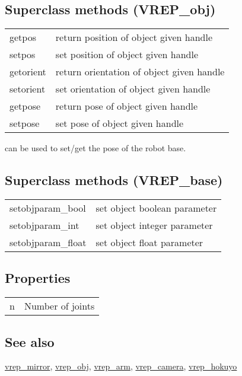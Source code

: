 \documentclass[a4paper]{article}
\begin{document}
\subsection*{Superclass methods (VREP\_obj)}
\begin{tabular}{lp{120mm}}
 getpos & return position of object given handle\\ 
 setpos & set position of object given handle\\ 
 getorient & return orientation of object given handle\\ 
 setorient & set orientation of object given handle\\ 
 getpose & return pose of object given handle\\ 
 setpose & set pose of object given handle\\ 
\end{tabular}\vspace{1ex}
can be used to set/get the pose of the robot base.

\subsection*{Superclass methods (VREP\_base)}
\begin{tabular}{lp{120mm}}
 setobjparam\_bool & set object boolean parameter\\ 
 setobjparam\_int & set object integer parameter\\ 
 setobjparam\_float & set object float parameter\\ 
\end{tabular}\vspace{1ex}
\subsection*{Properties}
\begin{tabular}{lp{120mm}}
 n  & Number of joints\\ 
\end{tabular}\vspace{1ex}
\subsection*{See also}


\hyperlink{vrep_mirror}{\color{blue} vrep\_mirror}, \hyperlink{vrep_obj}{\color{blue} vrep\_obj}, \hyperlink{vrep_arm}{\color{blue} vrep\_arm}, \hyperlink{vrep_camera}{\color{blue} vrep\_camera}, \hyperlink{vrep_hokuyo}{\color{blue} vrep\_hokuyo}
\end{document}
